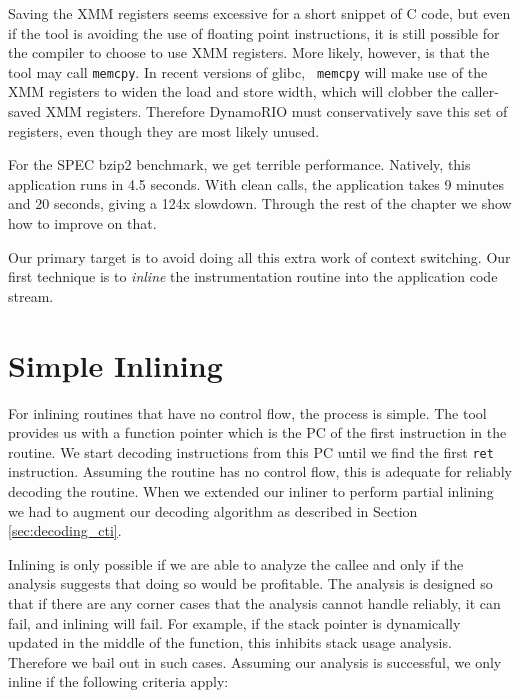 Saving the XMM registers seems excessive for a short snippet of C code, but even
if the tool is avoiding the use of floating point instructions, it is still
possible for the compiler to choose to use XMM registers.  More likely, however,
is that the tool may call {\tt memcpy}.  In recent versions of glibc, {\tt
memcpy} will make use of the XMM registers to widen the load and store width,
which will clobber the caller-saved XMM registers.  Therefore DynamoRIO must
conservatively save this set of registers, even though they are most likely
unused.

For the SPEC bzip2 benchmark, we get terrible performance.  Natively, this
application runs in 4.5 seconds.  With clean calls, the application takes 9
minutes and 20 seconds, giving a 124x slowdown.  Through the rest of the
chapter we show how to improve on that.

Our primary target is to avoid doing all this extra work of context switching.
Our first technique is to {\em inline} the instrumentation routine into the
application code stream.

\section{Simple Inlining}
\label{sec:simple_inlining}

For inlining routines that have no control flow, the process is simple.  The
tool provides us with a function pointer which is the PC of the first
instruction in the routine.  We start decoding instructions from this PC until
we find the first {\tt ret} instruction.  Assuming the routine has no control
flow, this is adequate for reliably decoding the routine.  When we extended our
inliner to perform partial inlining we had to augment our decoding algorithm as
described in Section \ref{sec:decoding_cti}.

Inlining is only possible if we are able to analyze the callee and only if the
analysis suggests that doing so would be profitable.  The analysis is designed
so that if there are any corner cases that the analysis cannot handle reliably,
it can fail, and inlining will fail.  For example, if the stack pointer is
dynamically updated in the middle of the function, this inhibits stack usage
analysis.  Therefore we bail out in such cases.  Assuming our analysis is
successful, we only inline if the following criteria apply:

